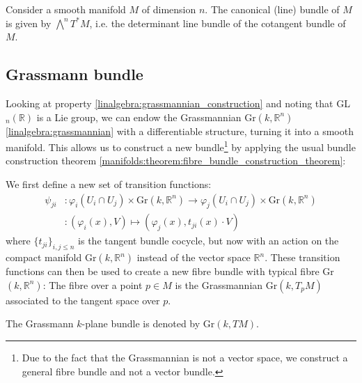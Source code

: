 	\begin{example}
		Consider a smooth manifold $M$ of dimension $n$. The canonical (line) bundle of $M$ is given by $\bigwedge^nT^*M$, i.e. the determinant line bundle of the cotangent bundle of $M$.
	\end{example}
	
\subsection{Grassmann bundle}

	Looking at property \ref{linalgebra:grassmannian_construction} and noting that GL$_n(\mathbb{R})$ is a Lie group, we can endow the Grassmannian Gr$(k, \mathbb{R}^n)$ \ref{linalgebra:grassmannian} with a differentiable structure, turning it into a smooth manifold. This allows us to construct a new bundle\footnote{Due to the fact that the Grassmannian is not a vector space, we construct a general fibre bundle and not a vector bundle.} by applying the usual bundle construction theorem \ref{manifolds:theorem:fibre_bundle_construction_theorem}:
	
	\begin{construct}\label{manifolds:grassmann_bundle}
		We first define a new set of transition functions:
		\begin{align}
			\psi_{ji}&:\varphi_i(U_i\cap U_j)\times \text{Gr}(k, \mathbb{R}^n) \rightarrow \varphi_j(U_i\cap U_j)\times \text{Gr}(k, \mathbb{R}^n)\nonumber\\
			&:(\varphi_i(x), V)\mapsto(\varphi_j(x), t_{ji}(x)\cdot V)
		\end{align}
		where $\{t_{ji}\}_{i, j\leq n}$ is the tangent bundle cocycle, but now with an action on the compact manifold Gr$(k, \mathbb{R}^n)$ instead of the vector space $\mathbb{R}^n$. These transition functions can then be used to create a new fibre bundle with typical fibre Gr$(k, \mathbb{R}^n)$: The fibre over a point $p\in M$ is the Grassmannian Gr$(k, T_pM)$ associated to the tangent space over $p$.
	\end{construct}
	\begin{notation}
		The Grassmann $k$-plane bundle is denoted by Gr$(k, TM)$.
	\end{notation}
	
	
